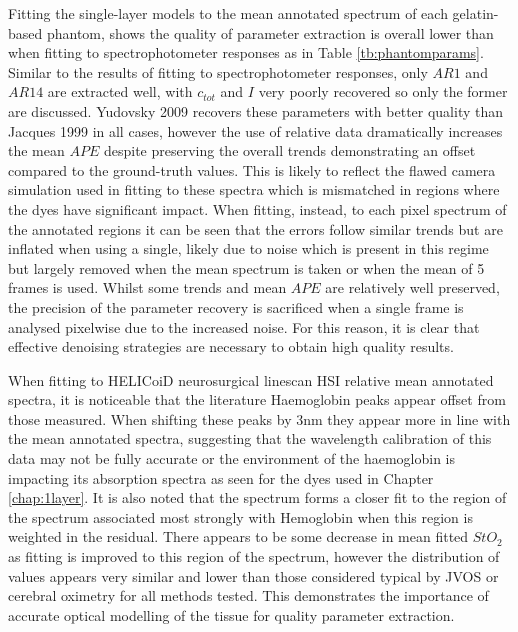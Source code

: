 Fitting the single-layer models to the mean annotated spectrum of each gelatin-based phantom, shows the quality of parameter extraction is overall lower than when fitting to spectrophotometer responses as in Table \ref{tb:phantomparams}. Similar to the results of fitting to spectrophotometer responses, only $AR1$ and $AR14$ are extracted well, with $c_{tot}$ and $I$ very poorly recovered so only the former are discussed. Yudovsky 2009 recovers these parameters with better quality than Jacques 1999 in all cases, however the use of relative data dramatically increases the mean $APE$ despite preserving the overall trends demonstrating an offset compared to the ground-truth values. This is likely to reflect the flawed camera simulation used in fitting to these spectra which is mismatched in regions where the dyes have significant impact. When fitting, instead, to each pixel spectrum of the annotated regions it can be seen that the errors follow similar trends but are inflated when using a single, likely due to noise which is present in this regime but largely removed when the mean spectrum is taken or when the mean of 5 frames is used. Whilst some trends and mean $APE$ are relatively well preserved, the precision of the parameter recovery is sacrificed when a single frame is analysed pixelwise due to the increased noise. For this reason, it is clear that effective denoising strategies are necessary to obtain high quality results. 

When fitting to HELICoiD neurosurgical linescan HSI relative mean annotated spectra, it is noticeable that the literature Haemoglobin peaks appear offset from those measured. When shifting these peaks by 3nm they appear more in line with the mean annotated spectra, suggesting that the wavelength calibration of this data may not be fully accurate or the environment of the haemoglobin is impacting its absorption spectra as seen for the dyes used in Chapter \ref{chap:1layer}. It is also noted that the spectrum forms a closer fit to the region of the spectrum associated most strongly with Hemoglobin when this region is weighted in the residual. There appears to be some decrease in mean fitted $StO_2$ as fitting is improved to this region of the spectrum, however the distribution of values appears very similar and lower than those considered typical by JVOS or cerebral oximetry for all methods tested. This demonstrates the importance of accurate optical modelling of the tissue for quality parameter extraction. 

